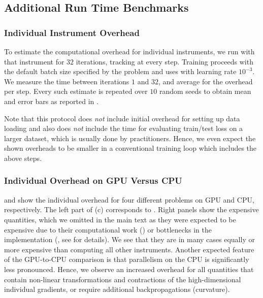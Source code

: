 \subsection{Additional Run Time
  Benchmarks}\label{cockpit::app:run-time-benchmarks}

\subsubsection{Individual Instrument
  Overhead}\label{cockpit::app:benchmark-instruments}
To estimate the computational overhead for individual instruments, we run
\cockpit with that instrument for $32$ iterations, tracking at every step.
Training proceeds with the default batch size specified by the \deepobs problem
and uses \sgd with learning rate $10^{-3}$. We measure the time between
iterations $1$ and $32$, and average for the overhead per step. Every such
estimate is repeated over $10$ random seeds to obtain mean and error bars as
reported in .

Note that this protocol does \textit{not} include initial overhead for setting
up data loading and also does \textit{not} include the time for evaluating
train/test loss on a larger dataset, which is usually done by practitioners.
Hence, we even expect the shown overheads to be smaller in a conventional
training loop which includes the above steps.

\subsubsection{Individual Overhead on GPU Versus CPU}

 and
 show the individual overhead
for four different \deepobs problems on GPU and CPU, respectively. The left part
of  (c) corresponds to
. Right panels show the expensive
quantities, which we omitted in the main text as they were expected to be
expensive due to their computational work () or
bottlenecks in the implementation (, see
 for details). We see that they are in many cases
equally or more expensive than computing all other instruments. Another expected
feature of the GPU-to-CPU comparison is that parallelism on the CPU is
significantly less pronounced. Hence, we observe an increased overhead for all
quantities that contain non-linear transformations and contractions of the
high-dimensional individual gradients, or require additional backpropagations
(curvature).





